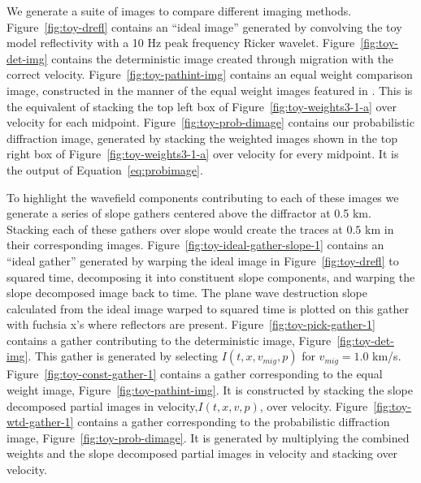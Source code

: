 We generate a suite of images to compare different imaging methods. Figure~\ref{fig:toy-drefl} contains an ``ideal image'' generated by convolving the toy model reflectivity with a 10 Hz peak frequency Ricker wavelet. Figure~\ref{fig:toy-det-img} contains the deterministic image created through migration with the correct velocity.     Figure~\ref{fig:toy-pathint-img} contains an equal weight  comparison image, constructed in the manner of the equal weight images featured in \cite{merzlikin2017}.  This is the equivalent of stacking the top left box of Figure~\ref{fig:toy-weights3-1-a} over velocity for each midpoint. Figure~\ref{fig:toy-prob-dimage} contains our probabilistic diffraction image, generated by stacking the weighted images shown in the top right box of Figure~\ref{fig:toy-weights3-1-a} over velocity for every midpoint.  It is the output of Equation~\ref{eq:probimage}.  

To highlight the wavefield components contributing to each of these images we generate a series of slope gathers centered above the diffractor at 0.5 km.  Stacking each of these gathers over slope would create the traces at $0.5$ km in their corresponding images.  Figure~\ref{fig:toy-ideal-gather-slope-1} contains an ``ideal gather'' generated by warping the ideal image in Figure~\ref{fig:toy-drefl} to squared time, decomposing it into constituent slope components, and warping the slope decomposed image back to time. The plane wave destruction slope calculated from the ideal image warped to squared time  is plotted on this gather with fuchsia x's where reflectors are present.  Figure~\ref{fig:toy-pick-gather-1} contains a gather contributing to the deterministic image, Figure~\ref{fig:toy-det-img}. This gather is generated by selecting $I\left(t,x,v_{mig},p\right)$ for $v_{mig} = 1.0$ km/s.  Figure~\ref{fig:toy-const-gather-1} contains a gather corresponding to the equal weight image, Figure~\ref{fig:toy-pathint-img}.  It is constructed by stacking the slope decomposed partial images in velocity,$I\left(t,x,v,p\right)$, over velocity.  Figure~\ref{fig:toy-wtd-gather-1} contains a gather corresponding to the probabilistic diffraction image, Figure~\ref{fig:toy-prob-dimage}.  It is generated by multiplying the combined weights and the slope decomposed partial images in velocity and stacking over velocity.



